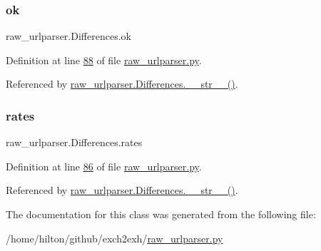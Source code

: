 \mbox{\label{classraw__urlparser_1_1_differences_a46fe97bedb977585a0b27d7408ace118}} 
\subsubsection{\texorpdfstring{ok}{ok}}
{\footnotesize\ttfamily raw\+\_\+urlparser.\+Differences.\+ok}



Definition at line \hyperlink{raw__urlparser_8py_source_l00088}{88} of file \hyperlink{raw__urlparser_8py_source}{raw\+\_\+urlparser.\+py}.



Referenced by \hyperlink{raw__urlparser_8py_source_l00100}{raw\+\_\+urlparser.\+Differences.\+\_\+\+\_\+str\+\_\+\+\_\+()}.

\mbox{\label{classraw__urlparser_1_1_differences_ad4e7eadb659a1cdcba90793cc52af174}} 
\subsubsection{\texorpdfstring{rates}{rates}}
{\footnotesize\ttfamily raw\+\_\+urlparser.\+Differences.\+rates}



Definition at line \hyperlink{raw__urlparser_8py_source_l00086}{86} of file \hyperlink{raw__urlparser_8py_source}{raw\+\_\+urlparser.\+py}.



Referenced by \hyperlink{raw__urlparser_8py_source_l00100}{raw\+\_\+urlparser.\+Differences.\+\_\+\+\_\+str\+\_\+\+\_\+()}.



The documentation for this class was generated from the following file\+:\begin{DoxyCompactItemize}
\item 
/home/hilton/github/exch2exh/\hyperlink{raw__urlparser_8py}{raw\+\_\+urlparser.\+py}\end{DoxyCompactItemize}
